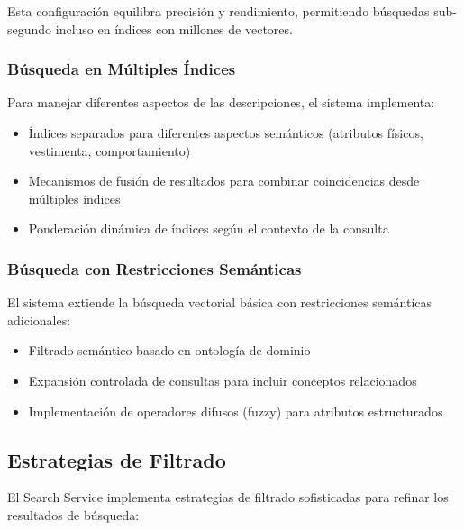 \documentclass[12pt,a4paper]{article}
\begin{document}
Esta configuración equilibra precisión y rendimiento, permitiendo búsquedas sub-segundo incluso en índices con millones de vectores.

\subsubsection{Búsqueda en Múltiples Índices}
Para manejar diferentes aspectos de las descripciones, el sistema implementa:

\begin{itemize}
    \item Índices separados para diferentes aspectos semánticos (atributos físicos, vestimenta, comportamiento)
    \item Mecanismos de fusión de resultados para combinar coincidencias desde múltiples índices
    \item Ponderación dinámica de índices según el contexto de la consulta
\end{itemize}

\subsubsection{Búsqueda con Restricciones Semánticas}
El sistema extiende la búsqueda vectorial básica con restricciones semánticas adicionales:

\begin{itemize}
    \item Filtrado semántico basado en ontología de dominio
    \item Expansión controlada de consultas para incluir conceptos relacionados
    \item Implementación de operadores difusos (fuzzy) para atributos estructurados
\end{itemize}

\subsection{Estrategias de Filtrado}
\label{subsec:ss-filtrado}

El Search Service implementa estrategias de filtrado sofisticadas para refinar los resultados de búsqueda:
\end{document}
